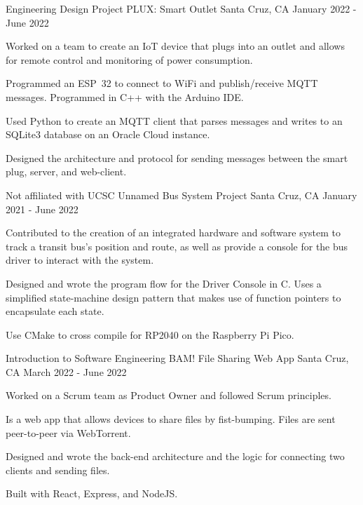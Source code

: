 \begin{cventries}
  \cventry
    {Engineering Design Project} %
    {PLUX: Smart Outlet} %
    {Santa Cruz, CA} %
    {January 2022 - June 2022} %
    {
      \begin{cvitems} %
        \item {Worked on a team to create an IoT device that plugs into an outlet and allows for remote control and monitoring of power consumption.}
        \item {Programmed an ESP~32 to connect to WiFi and publish/receive MQTT messages. Programmed in C++ with the Arduino IDE.}
        \item {Used Python to create an MQTT client that parses messages and writes to an SQLite3 database on an Oracle Cloud instance.}
        \item {Designed the architecture and protocol for sending messages between the smart plug, server, and web-client.}
      \end{cvitems}
    }

  \cventry
    {Not affiliated with UCSC} %
    {Unnamed Bus System Project} %
    {Santa Cruz, CA} %
    {January 2021 - June 2022} %
    {
      \begin{cvitems} %
      	\item {Contributed to the creation of an integrated hardware and software system to track a transit bus's position and  route, as well as provide a console for the bus driver to interact with the system.}
      	\item {Designed and wrote the program flow for the Driver Console in C. Uses a simplified state-machine design pattern that makes use of function pointers to encapsulate each state.}
      	\item {Use CMake to cross compile for RP2040 on the Raspberry Pi Pico.}
      \end{cvitems}
    }
    
  \cventry
    {Introduction to Software Engineering}
    {BAM! File Sharing Web App}
    {Santa Cruz, CA}
    {March 2022 - June 2022}
    {
        \begin{cvitems}
            \item {Worked on a Scrum team as Product Owner and followed Scrum principles.}
            \item {Is a web app that allows devices to share files by fist-bumping. Files are sent peer-to-peer via WebTorrent.}
            \item {Designed and wrote the back-end architecture and the logic for connecting two clients and sending files.}
            \item {Built with React, Express, and NodeJS.}
        \end{cvitems}
    }


\end{cventries}
